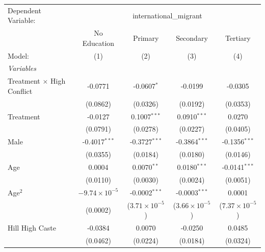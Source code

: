 
\begingroup
\centering
\begin{tabular}{lcccc}
   \tabularnewline \midrule \midrule
   Dependent Variable: & \multicolumn{4}{c}{international\_migrant}\\
                                     & No Education           & Primary                 & Secondary               & Tertiary \\   
   Model:                            & (1)                    & (2)                     & (3)                     & (4)\\  
   \midrule
   \emph{Variables}\\
   Treatment $\times$ High Conflict  & -0.0771                & -0.0607$^{*}$           & -0.0199                 & -0.0305\\   
                                     & (0.0862)               & (0.0326)                & (0.0192)                & (0.0353)\\   
   Treatment                         & -0.0127                & 0.1007$^{***}$          & 0.0910$^{***}$          & 0.0270\\   
                                     & (0.0791)               & (0.0278)                & (0.0227)                & (0.0405)\\   
   Male                              & -0.4017$^{***}$        & -0.3727$^{***}$         & -0.3864$^{***}$         & -0.1356$^{***}$\\   
                                     & (0.0355)               & (0.0184)                & (0.0180)                & (0.0146)\\   
   Age                               & 0.0004                 & 0.0070$^{**}$           & 0.0180$^{***}$          & -0.0141$^{***}$\\   
                                     & (0.0110)               & (0.0030)                & (0.0024)                & (0.0051)\\   
   Age$^2$                           & $-9.74\times 10^{-5}$  & -0.0002$^{***}$         & -0.0003$^{***}$         & 0.0001\\   
                                     & (0.0002)               & ($3.71\times 10^{-5}$)  & ($3.66\times 10^{-5}$)  & ($7.37\times 10^{-5}$)\\    
   Hill High Caste                   & -0.0384                & 0.0070                  & -0.0250                 & 0.0485\\   
                                     & (0.0462)               & (0.0224)                & (0.0184)                & (0.0324)\\   

\end{tabular}
